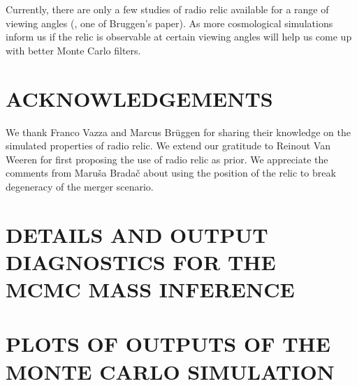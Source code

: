 Currently, there are only a few studies of
 radio relic available for a range of viewing angles (, one of
Bruggen's paper). As more cosmological simulations inform us  
if the relic is observable at certain viewing angles will help us 
come up with better Monte Carlo filters. 

\section{ACKNOWLEDGEMENTS}
We thank Franco Vazza and Marcus Br\"{u}ggen for sharing their knowledge on
the simulated properties of radio relic. We
extend our gratitude to Reinout Van Weeren for first proposing the use of
radio relic as prior. We appreciate the comments from Maru\v{s}a
Brada\v{c} about using the position of the relic to break degeneracy
of the merger scenario. 





\appendix

%

\section{DETAILS AND OUTPUT DIAGNOSTICS FOR THE MCMC MASS INFERENCE}\label{app:MCMC}


\section{PLOTS OF OUTPUTS OF THE MONTE CARLO SIMULATION}


\bsp 
\label{lastpage} 


